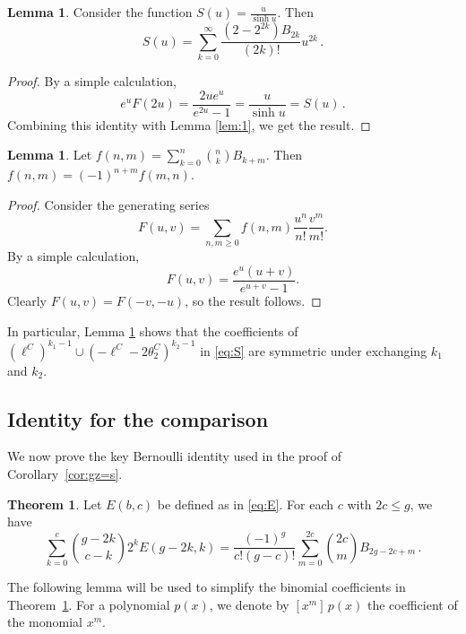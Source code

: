 \documentclass[11pt]{article}
\theoremstyle{definition}
\newtheorem{theorem}[definition]{Theorem}
\newtheorem{lemma}[definition]{Lemma}
\begin{document}
\begin{lemma}\label{lem:3}
    Consider the function $S(u) = \frac{u}{\sinh u}$. Then
    \[
    S(u) = \sum_{k=0}^\infty \frac{(2-2^{2k}) B_{2k}}{(2k)!}u^{2k}\,.
    \]
\end{lemma}
\begin{proof}
    By a simple calculation,
    \[
    e^u F(2u) = \frac{2u e^u}{e^{2u}-1} = \frac{u}{\sinh u} = S(u)\,.
    \]
    Combining this identity with Lemma \ref{lem:1}, we get the result.
\end{proof}
\begin{lemma}\label{lem:4}
    Let $f(n,m) = \sum_{k=0}^n \binom{n}{k} B_{k+m}$. Then $f(n,m) = (-1)^{n+m} f(m,n)$.
\end{lemma}
\begin{proof}
    Consider the generating series
    \[
    F(u,v) = \sum_{n,m \geq 0} f(n,m) \frac{u^n}{n!} \frac{v^m}{m!}.
    \]
    By a simple calculation,
    \[
    F(u,v) = \frac{e^u(u+v)}{e^{u+v}-1}.
    \]
    Clearly $F(u,v) = F(-v,-u)$, so the result follows.
\end{proof}
In particular, Lemma \ref{lem:4} shows that the coefficients of $(\ell^C)^{k_1-1}\cup(-\ell^C-2\theta_2^C)^{k_2-1}$ in \eqref{eq:S} are symmetric under exchanging $k_1$ and $k_2$.


\subsection{Identity for the comparison}
We now prove the key Bernoulli identity used in the proof of Corollary~\ref{cor:gz=s}.
\begin{theorem}\label{sp:final}
    Let $E(b,c)$ be defined as in \eqref{eq:E}. For each $c$ with $2c\leq g$, we have
    \[
    \sum_{k=0}^c \binom{g-2k}{c-k} 2^{k} E(g-2k,k) = \frac{(-1)^g}{c!(g-c)!} \sum_{m=0}^{2c} \binom{2c}{m} B_{2g-2c+m}\,.
    \]
\end{theorem}

The following lemma will be used to simplify the binomial coefficients in Theorem~\ref{sp:final}. For a polynomial $p(x)$, we denote by $[x^m]\,p(x)$ the coefficient of the monomial $x^m$.
\end{document}
